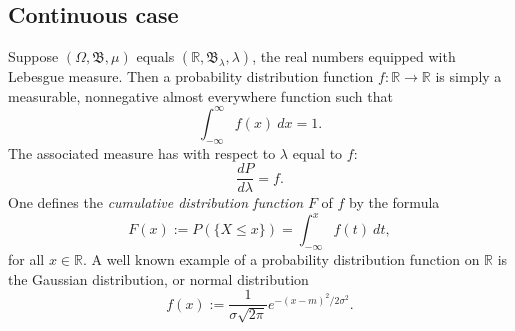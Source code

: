 \documentclass[12pt]{article}
\newcommand{\borel}{\mathfrak{B}}
\newcommand{\reals}{\mathbb{R}}
\begin{document}
\subsection{Continuous case}
Suppose $(\Omega, \borel, \mu)$ equals $(\reals, \borel_\lambda, \lambda)$, the real numbers equipped with Lebesgue measure. Then a probability distribution function $f: \reals \longrightarrow \reals$ is simply a measurable, nonnegative almost everywhere function such that
$$
\int_{-\infty}^\infty f(x)\ dx = 1.
$$
The associated measure has  with respect to $\lambda$ equal to $f$:
$$
\frac{dP}{d\lambda} = f.
$$
One defines the {\em cumulative distribution function} $F$ of $f$ by the formula
$$
F(x) := P(\{X \leq x\}) = \int_{-\infty}^x f(t)\ dt,
$$
for all $x \in \reals$. A well known example of a probability distribution function on $\reals$ is the Gaussian distribution, or normal distribution
$$
f(x) := \frac{1}{\sigma \sqrt{2 \pi}} e^{-(x-m)^2/2\sigma^2}.
$$
\end{document}
